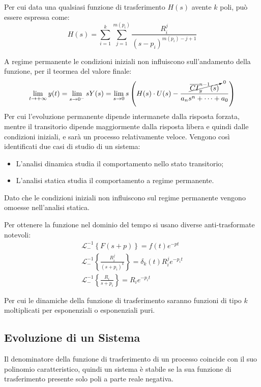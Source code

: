 \documentclass{article}
\numberwithin{equation}{subsection}
\begin{document}
Per cui data una qualsiasi funzione di trasferimento $H(s)$ avente $k$ poli, può essere espressa come:
\begin{equation}
    H(s)=\displaystyle\sum_{i=1}^{k}\sum_{j=1}^{m(p_i)}\frac{R_i^j}{(s-p_i)^{m(p_i)-j+1}}
\end{equation}


A regime permanente le condizioni iniziali non influiscono sull'andamento della funzione, per il teormea del valore finale:
\begin{equation}
    \displaystyle\lim_{t\to+\infty}y(t)=\lim_{s\to0^-}sY(s)=\lim_{s\to0}s\left(H(s)\cdot U(s)-\frac{\cancelto{0}{\overline{CI}_y^{n-1}(s)}}{a_ns^n+\cdots+a_0}\right)
\end{equation}
Per cui l'evoluzione permanente dipende intermanete dalla risposta forzata, mentre il transitorio dipende maggiormente dalla risposta libera e quindi dalle condizioni iniziali, e 
sarà un processo relativamente veloce. Vengono così identificati due casi di studio di un sistema:
\begin{itemize}
    \item L'analisi dinamica studia il comportamento nello stato transitorio; 
    \item L'analisi statica studia il comportamento a regime permanente. 
\end{itemize} 
Dato che le condizioni iniziali non influiscono sul regime permanente vengono omoesse nell'analisi statica. 

Per ottenere la funzione nel dominio del tempo si usano diverse anti-trasformate notevoli:
\begin{gather}
    \mathscr{L}_-^{-1}\left\{F(s+p)\right\}=f(t)e^{-pt}\\
    \mathscr{L}_-^{-1}\left\{\displaystyle\frac{R_i^j}{(s+p_i)^k}\right\}=\delta_k(t)R_i^je^{-p_it}\\
    \mathscr{L}_-^{-1}\left\{\displaystyle\frac{R_i}{s+p_i}\right\}=R_ie^{-p_it}
\end{gather}

Per cui le dinamiche della funzione di trasferimento saranno funzioni di tipo $k$ moltiplicati per esponenziali o esponenziali puri. 

\subsection{Evoluzione di un Sistema}

Il denominatore della funzione di trasferimento di un processo coincide con il suo polinomio caratteristico, quindi un sistema è stabile se la sua funzione di trasferimento 
presente solo poli a parte reale negativa. 
\end{document}
